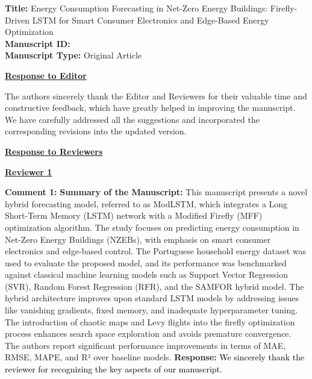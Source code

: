 \documentclass[12pt]{article}
\begin{document}
\hspace{-0.7cm}\textbf{Title:} Energy Consumption Forecasting in Net-Zero
Energy Buildings: Firefly-Driven LSTM for Smart
Consumer Electronics and Edge-Based Energy
Optimization\\
	\textbf{Manuscript ID: }\\
	\textbf{Manuscript Type:} Original Article



\begin{center}
	\fontsize{14}{1}\textbf{\underline{Response to Editor}}\\
\end{center}

The authors sincerely thank the Editor and Reviewers for their valuable time and constructive feedback, which have greatly helped in improving the manuscript. We have carefully addressed all the suggestions and incorporated the corresponding revisions into the updated version.



\begin{center}
	\fontsize{14}{1}\textbf{\underline{Response to Reviewers}}\\
\end{center}


\begin{center}
\fontsize{14}{1}\textbf{\underline{Reviewer 1}}\\
\end{center}





\noindent\textbf{Comment 1:} \textbf{Summary of the Manuscript:} This manuscript presents a novel hybrid forecasting model, referred to as ModLSTM, which integrates a Long Short-Term Memory (LSTM) network with a Modified Firefly (MFF) optimization algorithm. The study focuses on predicting energy consumption in Net-Zero Energy Buildings (NZEBs), with emphasis on smart consumer electronics and edge-based control. The Portuguese household energy dataset was used to evaluate the proposed model, and its performance was benchmarked against classical machine learning models such as Support Vector Regression (SVR), Random Forest Regression (RFR), and the SAMFOR hybrid model.
The hybrid architecture improves upon standard LSTM models by addressing issues like vanishing gradients, fixed memory, and inadequate hyperparameter tuning. The introduction of chaotic maps and Levy flights into the firefly optimization process enhances search space exploration and avoids premature convergence. The authors report significant performance improvements in terms of MAE, RMSE, MAPE, and R² over baseline models. \newline
\vspace{0.15cm}\textbf{Response:}
\noindent\textcolor{black}{We sincerely thank the reviewer for recognizing the key aspects of our manuscript.}\newline
\newline
\end{document}
